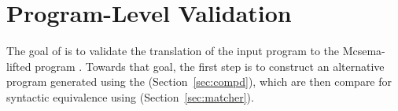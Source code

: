 \section{Program-Level Validation}\label{sec:plv}
The goal of \plv is to validate the translation of the input \ISA program
 to the Mcsema-lifted \LLVM program .  Towards that goal, the first step
is to construct an alternative program  generated using the \compd
(Section~\ref{sec:compd}), which are then compare for syntactic equivalence 
using (Section~\ref{sec:matcher}).


%

